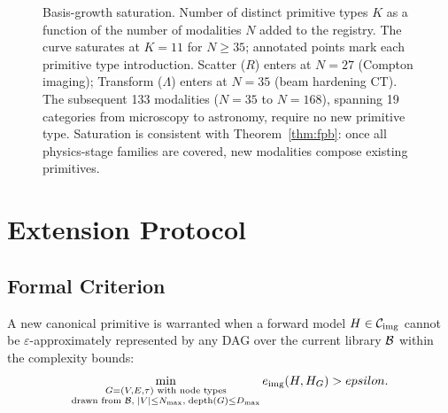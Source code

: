 \documentclass[11pt]{article}
\begin{document}
\begin{figure}[htbp]
\caption{Basis-growth saturation. Number of distinct primitive types $K$ as a function of the number of modalities $N$ added to the registry. The curve saturates at $K = 11$ for $N \geq 35$; annotated points mark each primitive type introduction. Scatter ($R$) enters at $N = 27$ (Compton imaging); Transform ($\Lambda$) enters at $N = 35$ (beam hardening CT). The subsequent 133 modalities ($N = 35$ to $N = 168$), spanning 19 categories from microscopy to astronomy, require no new primitive type. Saturation is consistent with Theorem~\ref{thm:fpb}: once all physics-stage families are covered, new modalities compose existing primitives.}
\label{fig:growth}
\end{figure}


\section{Extension Protocol}
\label{sec:extension}

\subsection{Formal Criterion}

A new canonical primitive is warranted when a forward model $H \in \mathcal{C}_{\mathrm{img}}$ cannot be $\varepsilon$-approximately represented by any DAG over the current library $\mathcal{B}$ within the complexity bounds:
\begin{equation}
  \min_{\substack{G = (V,E,\tau) \text{ with node types} \\ \text{drawn from } \mathcal{B},\; |V| \leq N_{\max},\; \mathrm{depth}(G) \leq D_{\max}}} e_{\mathrm{img}}(H, H_{G}) > epsilon.
  \label{eq:extension}
\end{equation}
\end{document}
